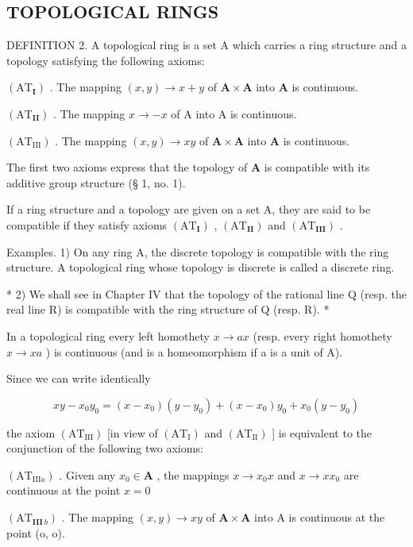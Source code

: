 \subsection{TOPOLOGICAL RINGS}

DEFINITION 2. A topological ring is a set A which carries a ring structure and a topology satisfying the following axioms:

\((\mathrm{AT}_{\mathbf{I}})\) . The mapping \((x,y) \to x + y\) of \(\mathbf{A} \times \mathbf{A}\) into \(\mathbf{A}\) is continuous.

\((\mathrm{AT}_{\mathbf{II}})\) . The mapping \(x \to -x\) of A into A is continuous.

\((\mathrm{AT}_{\mathrm{III}})\) . The mapping \((x,y)\to xy\) of \(\mathbf{A}\times \mathbf{A}\) into \(\mathbf{A}\) is continuous.

The first two axioms express that the topology of \(\mathbf{A}\) is compatible with its additive group structure (§ 1, no. 1).

If a ring structure and a topology are given on a set A, they are said to be compatible if they satisfy axioms \((\mathrm{AT}_{\mathbf{I}})\) , \((\mathrm{AT}_{\mathbf{II}})\) and \((\mathrm{AT}_{\mathbf{III}})\) .

Examples. 1) On any ring A, the discrete topology is compatible with the ring structure. A topological ring whose topology is discrete is called a discrete ring.

* 2) We shall see in Chapter IV that the topology of the rational line Q (resp. the real line R) is compatible with the ring structure of Q (resp. R). *

In a topological ring every left homothety \(x \rightarrow ax\) (resp. every right homothety \(x \rightarrow xa\) ) is continuous (and is a homeomorphism if a is a unit of A).

Since we can write identically

\[
x y - x _ {0} y _ {0} = (x - x _ {0}) (y - y _ {0}) + (x - x _ {0}) y _ {0} + x _ {0} (y - y _ {0})
\]

the axiom \((\mathrm{AT}_{\mathrm{III}})\) {[}in view of \((\mathrm{AT}_{\mathrm{I}})\) and \((\mathrm{AT}_{\mathrm{II}})\) {]} is equivalent to the conjunction of the following two axioms:

\((\mathrm{AT}_{\mathrm{III}a})\) . Given any \(x_0\in \mathbf{A}\) , the mappings \(x\to x_0x\) and \(x\rightarrow xx_0\) are continuous at the point \(x = 0\)

\((\mathrm{AT}_{\mathbf{III}\ b})\) . The mapping \((x,y)\rightarrow xy\) of \(\mathbf{A}\times \mathbf{A}\) into A is continuous at the point (o, o).

